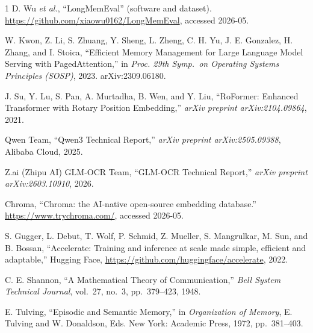 \documentclass[conference]{IEEEtran}
\begin{document}
\begin{thebibliography}{1}
    D. Wu \textit{et al.}, ``LongMemEval'' (software and dataset). \url{https://github.com/xiaowu0162/LongMemEval}, accessed 2026-05.

    W. Kwon, Z. Li, S. Zhuang, Y. Sheng, L. Zheng, C. H. Yu, J. E. Gonzalez, H. Zhang, and I. Stoica, ``Efficient Memory Management for Large Language Model Serving with PagedAttention,'' in \textit{Proc. 29th Symp.\ on Operating Systems Principles (SOSP)}, 2023. arXiv:2309.06180.

    J. Su, Y. Lu, S. Pan, A. Murtadha, B. Wen, and Y. Liu, ``RoFormer: Enhanced Transformer with Rotary Position Embedding,'' \textit{arXiv preprint arXiv:2104.09864}, 2021.

    Qwen Team, ``Qwen3 Technical Report,'' \textit{arXiv preprint arXiv:2505.09388}, Alibaba Cloud, 2025.

    Z.ai (Zhipu AI) GLM-OCR Team, ``GLM-OCR Technical Report,'' \textit{arXiv preprint arXiv:2603.10910}, 2026.

    Chroma, ``Chroma: the AI-native open-source embedding database.'' \url{https://www.trychroma.com/}, accessed 2026-05.

    S. Gugger, L. Debut, T. Wolf, P. Schmid, Z. Mueller, S. Mangrulkar, M. Sun, and B. Bossan, ``Accelerate: Training and inference at scale made simple, efficient and adaptable,'' Hugging Face, \url{https://github.com/huggingface/accelerate}, 2022.

    C. E. Shannon, ``A Mathematical Theory of Communication,'' \textit{Bell System Technical Journal}, vol.\ 27, no.\ 3, pp.\ 379--423, 1948.

    E. Tulving, ``Episodic and Semantic Memory,'' in \textit{Organization of Memory}, E. Tulving and W. Donaldson, Eds. New York: Academic Press, 1972, pp.\ 381--403.

\end{thebibliography}
\end{document}
